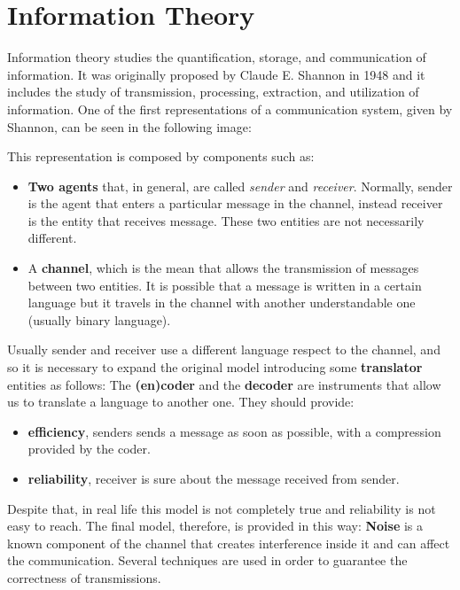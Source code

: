 \section {Information Theory}
Information theory studies the quantification, storage, and communication of information. It was originally proposed by Claude E. Shannon in 1948 and it includes the study of transmission, processing, extraction, and utilization of information. One of the first representations of a communication system, given by Shannon, can be seen in the following image:

This representation is composed by components such as:
\begin{itemize}
	\item \textbf{Two agents} that, in general, are called \textit{sender} and \textit{receiver}. Normally, sender is the agent that enters a particular message in the channel, instead receiver is the entity that receives message. These two entities are not necessarily different.
	\item A \textbf{channel}, which is the mean that allows the transmission of messages between two entities. It is possible that a message is written in a certain language but it travels in the channel with another understandable one (usually binary language).
\end{itemize}

Usually sender and receiver use a different language respect to the channel, and so it is necessary to expand the original model introducing some \textbf{translator} entities as follows: 
The \textbf{(en)coder} and the \textbf{decoder} are instruments that allow us to translate a language to another one. They should provide:
\begin{itemize}
	\item \textbf{efficiency}, senders sends a message as soon as possible, with a compression provided by the coder.
	\item \textbf{reliability}, receiver is sure about the message received from sender.
\end{itemize}
Despite that, in real life this model is not completely true and reliability is not easy to reach. The final model, therefore, is provided in this way: 
\textbf{Noise} is a known component of the channel that creates interference inside it and can affect the communication. Several techniques are used in order to guarantee the correctness of transmissions.

